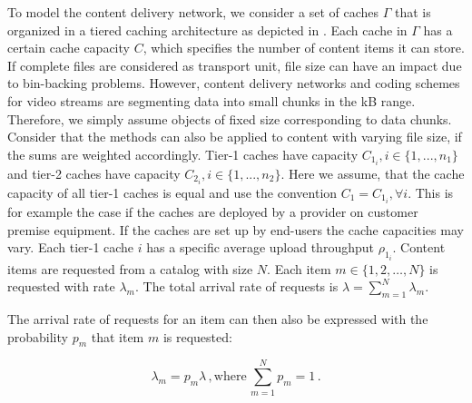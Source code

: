 To model the content delivery network, we consider a set of caches $\Gamma$ that is organized in a tiered caching architecture as depicted in . Each cache in $\Gamma$ has a certain cache capacity $C$, which specifies the number of content items it can store.
If complete files are considered as transport unit, file size can have an impact due to bin-backing problems.
However, content delivery networks and coding schemes for video streams are segmenting data into small chunks in the kB range.
Therefore, we simply assume objects of fixed size corresponding to data chunks.
Consider that the methods can also be applied to content with varying file size, if the sums are weighted accordingly.
Tier-1 caches have capacity $C_{1_i}, i\in\{1,...,n_1\}$ and tier-2 caches have capacity $C_{2_i}, i\in\{1,...,n_2\}$.
Here we assume, that the cache capacity of all tier-1 caches is equal and use the convention $C_1=C_{1_i}, \forall i$.
This is for example the case if the caches are deployed by a provider on customer premise equipment.
If the caches are set up by end-users the cache capacities may vary.
Each tier-1 cache $i$ has a specific average upload throughput $\rho_{1_i}$.
Content items are requested from a catalog with size $N$.
Each item $m\in \{1,2,\dots,N\}$ is requested with rate $\lambda_m$.
The total arrival rate of requests is $\lambda=\sum_{m=1}^N \lambda_m$.

The arrival rate of requests for an item can then also be expressed with the probability $p_m$ that item $m$ is requested:

\begin{equation}
\lambda_m = p_m \lambda \, , \text{where} \, \sum_{m=1}^N p_m = 1 \, .
\end{equation}



